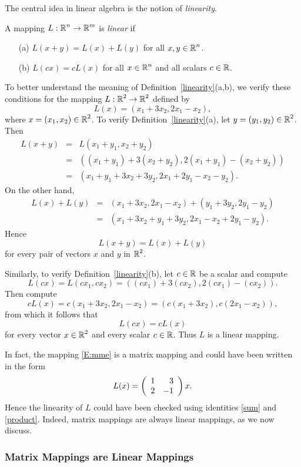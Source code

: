 \documentclass{ximera}
\begin{document}
The central idea in linear algebra is the notion of
{\em linearity\/}. 
\begin{definition} \label{linearity}
A mapping $L:\mbox{$\Bbb{R}$}^n\to\mbox{$\Bbb{R}$}^m$ is {\em linear}
if
\begin{itemize}
\item[(a)]  $L(x+y) = L(x) + L(y)$ for all $x,y\in\mbox{$\Bbb{R}$}^n$.
\item[(b)]  $L(cx) = cL(x)$ for all $x\in\mbox{$\Bbb{R}$}^n$ and all scalars
$c\in\mbox{$\Bbb{R}$}$.
\end{itemize}
\end{definition}

To better understand the meaning of Definition~\ref{linearity}(a,b),
we verify these conditions for the mapping $L:\mbox{$\Bbb{R}$}^2\to\mbox{$\Bbb{R}$}^2$ defined by
\begin{equation}  \label{E:mme}
L(x) = (x_1+3x_2,2x_1-x_2),
\end{equation}
where $x=(x_1,x_2)\in\mbox{$\Bbb{R}$}^2$.  To verify Definition~\ref{linearity}(a), let
$y=(y_1,y_2)\in\mbox{$\Bbb{R}$}^2$.  Then
\begin{eqnarray*}
L(x+y) & = & L(x_1+y_1,x_2+y_2)\\
& = & ((x_1+y_1)+3(x_2+y_2), 2(x_1+y_1)-(x_2+y_2)) \\
 & = & (x_1+y_1+3x_2+3y_2, 2x_1+2y_1-x_2-y_2).
\end{eqnarray*}
On the other hand,
\begin{eqnarray*}
L(x)+L(y) & = & (x_1+3x_2,2x_1-x_2) + (y_1+3y_2,2y_1-y_2) \\
 & = & (x_1+3x_2+y_1+3y_2, 2x_1-x_2+2y_1-y_2).
\end{eqnarray*}
Hence
\[
L(x+y) = L(x) + L(y)
\]
for every pair of vectors $x$ and $y $ in $\mbox{$\Bbb{R}$}^2$.

Similarly, to verify Definition~\ref{linearity}(b), let $c\in\mbox{$\Bbb{R}$}$ be a scalar
and compute
\[
L(cx) = L(cx_1,cx_2)=((cx_1)+3(cx_2),2(cx_1)-(cx_2)).
\]
Then compute
\[
cL(x) = c(x_1+3x_2,2x_1-x_2)= (c(x_1+3x_2), c(2x_1-x_2)),
\]
from which it follows that
\[
L(cx) = cL(x)
\]
for every vector $x\in\mbox{$\Bbb{R}$}^2$ and every scalar $c\in\mbox{$\Bbb{R}$}$.  Thus $L$ is a linear 
mapping.

In fact, the mapping \eqref{E:mme} is a matrix mapping and could
have been written in the form
\[
L(x) = \left(\begin{array}{rr} 1 & 3\\ 2 &-1\end{array}\right)x.
\]
Hence the linearity of $L$ could have been checked using identities
\eqref{sum} and \eqref{product}.  Indeed, matrix mappings are always linear
mappings, as we now discuss.

\subsubsection*{Matrix Mappings are Linear Mappings}
\end{document}
